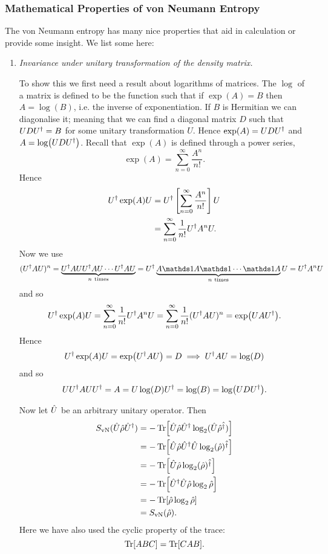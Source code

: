     \subsubsection{Mathematical Properties of von Neumann Entropy}
    The von Neumann entropy has many nice properties that aid in calculation or provide some insight.
    We list some here:
    \begin{enumerate}
        \item \emph{Invariance under unitary transformation of the density matrix.}
        
        To show this we first need a result about logarithms of matrices.
        The \(\log\) of a matrix is defined to be the function such that if \(\exp(A) = B\) then \(A = \log(B)\), i.e. the inverse of exponentiation.
        If \(B\) is Hermitian we can diagonalise it; meaning that we can find a diagonal matrix \(D\) such that \(UDU^\dagger = B\) for some unitary transformation \(U\).
        Hence \(\exp(A) = UDU^\dagger\) and \(A = \log(UDU^\dagger)\).
        Recall that \(\exp(A)\) is defined through a power series,
        \[\exp(A) = \sum_{n=0}^{\infty} \frac{A^n}{n!}.\]
        Hence
        \begin{align*}
            U^\dagger\exp(A)U &= U^\dagger\left[ \sum_{n=0}^{\infty} \frac{A^n}{n!} \right]U\\
            &= \sum_{n=0}^{\infty} \frac{1}{n!} U^\dagger A^nU.
        \end{align*}
        Now we use
        \[(U\hermit AU)^n = \underbrace{U\hermit AUU\hermit AU \dotsm U\hermit AU}_{n~\text{times}} = U\hermit\underbrace{A\ident A\ident \dotsm \ident A}_{n~\text{times}} U = U\hermit A^nU\]
        and so
        \[U^\dagger\exp(A)U = \sum_{n=0}^{\infty} \frac{1}{n!}U^\dagger A^nU = \sum_{n=0}^{\infty} \frac{1}{n!}(U^\dagger AU)^n = \exp(UAU^\dagger).\]
        Hence
        \[U^\dagger\exp(A)U = \exp(U^\dagger AU) = D \implies U^\dagger AU = \log(D)\]
        and so
        \[UU^\dagger AUU^\dagger = A = U\log(D)U^\dagger = \log(B) = \log(UDU^\dagger).\]
        
        Now let \(\hat{U}\) be an arbitrary unitary operator.
        Then
        \begin{align*}
            S_{\mathrm{vN}}(\hat{U}\hat{\rho}\hat{U}^\dagger) &= -\Tr[\hat{U}\hat{\rho}\hat{U}^\dagger \log_2 (\hat{U}\hat{\rho}\hat{^\dagger})]\\
            &= -\Tr[\hat{U}\hat{\rho}\hat{U}^\dagger \hat{U} \log_2 (\hat{\rho})\hat{^\dagger}]\\
            &= -\Tr[\hat{U}\hat{\rho}\log_2 (\hat{\rho})\hat{^\dagger}]\\
            &= -\Tr[\hat{U}^\dagger\hat{U}\hat{\rho}\log_2\hat{\rho}]\\
            &= -\Tr[\hat{\rho}\log_2\hat{\rho}]\\
            &= S_{\mathrm{vN}}(\hat{\rho}).
        \end{align*}
        Here we have also used the cyclic property of the trace:
        \[\Tr[ABC] = \Tr[CAB].\]
        

\end{enumerate}
